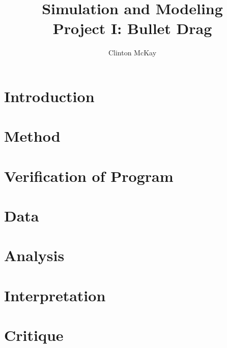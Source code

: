 \documentclass{article}%
\begin{document}
    \title{Simulation and Modeling\\Project I: Bullet Drag}
    \author{Clinton McKay}
    \maketitle

    \twocolumn

    \section{Introduction}

    \section{Method}

    \section{Verification of Program}

    \section{Data}
    
    \section{Analysis}

    \section{Interpretation}

    \section{Critique}
    
\end{document}

